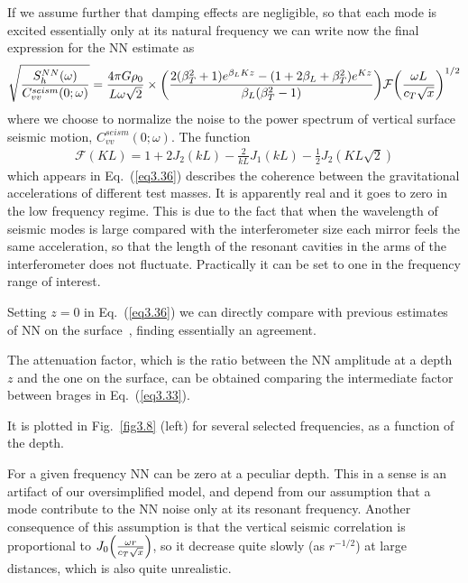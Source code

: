 If we assume further that damping effects are negligible, so that each mode is
excited essentially only at its natural frequency we can write now the final
expression for the NN estimate as
\begin{eqnarray}
\sqrt{\frac{S^{NN}_{h}(\omega)}{C^{seism}_{vv}(0;\omega)}}= 
\frac{4\pi G\rho_{0}}{L\omega\sqrt{2}}
\times\bigg{(}\frac{2(\beta^{2}_{T}+1)e^{\beta_{L}Kz}-(1+2\beta_{L}+\beta^{2}_{T})
e^{Kz}}{\beta_{L}(\beta^{2}_{T}-1)}\bigg{)}\mathcal{F}\bigg{(}
\frac{\omega L}{c_{T}\sqrt{x}}\bigg{)}^{1/2}
\label{eq3.36}
\end{eqnarray}
where we choose to normalize the noise to the power spectrum of vertical
surface seismic motion, $C^{seism}_{vv}(0;\omega)$.
The function
\begin{eqnarray}
\mathcal{F}(KL)=1+2J_{2}(kL)-\frac{2}{kL}J_{1}(kL)-\frac{1}{2}J_{2}(KL\sqrt{2})
\label{eq3.33}
\end{eqnarray}
which appears in Eq.~(\ref{eq3.36}) describes the coherence between the
gravitational accelerations of different test masses. It is apparently real
and it goes to zero in the low frequency regime. This is due to the fact that
when the wavelength of seismic modes is large compared with the interferometer
size each mirror feels the same acceleration, so that the length of the
resonant cavities in the arms of the interferometer does not
fluctuate. Practically it can be set to one in the frequency range of
interest.

Setting $z=0$ in Eq.~(\ref{eq3.36}) we can directly compare with previous
estimates of NN on the surface~\cite{GGSaulson, GGCellaCuoco, GGThorne},
finding essentially an agreement.

The attenuation factor, which is the ratio between the NN amplitude at a depth
$z$ and the one on the surface, can be obtained comparing the intermediate
factor between brages in Eq.~(\ref{eq3.33}). 

It is plotted in Fig.~\ref{fig3.8} (left) for several selected frequencies, as
a function of the depth.

For a given frequency NN can be zero at a peculiar depth. This in a sense is
an artifact of our oversimplified model, and depend from our assumption that a
mode contribute to the NN noise only at its resonant frequency. Another
consequence of this assumption is that the vertical seismic correlation is
proportional to $J_{0}\Big{(}\frac{\omega r}{c_{T}\sqrt{x}}\Big{)}$, so it
decrease quite slowly (as $r^{-1/2}$) at large distances, which is also quite
unrealistic.

